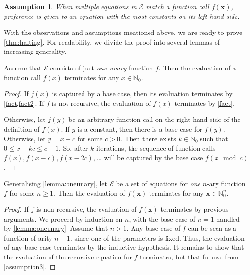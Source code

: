 \documentclass[a4paper,UKenglish,cleveref, autoref, thm-restate]{lipics-v2021}
\newtheorem{assumption}[theorem]{Assumption}
\begin{document}
\begin{assumption}
  When multiple equations in $\mathcal{E}$ match a function call
  $f(\mathbf{x})$, preference is given to an equation with the most constants on
  its left-hand side.
\end{assumption}

With the observations and assumptions mentioned above, we are ready to prove
\cref{thm:halting}. For readability, we divide the proof into several lemmas of
increasing generality.

\begin{lemma}\label{lemma:oneunary}
  Assume that $\mathcal{E}$ consists of just \emph{one unary} function $f$. Then
  the evaluation of a function call $f(x)$ terminates for any
  $x \in \mathbb{N}_{0}$.
\end{lemma}
\begin{proof}
  If $f(x)$ is captured by a base case, then its evaluation terminates by
  \cref{fact,fact2}. If $f$ is not recursive, the evaluation of
  $f(x)$ terminates by \cref{fact}.

  Otherwise, let $f(y)$ be an arbitrary function call on the right-hand side of
  the definition of $f(x)$. If $y$ is a constant, then there is a base case for
  $f(y)$. Otherwise, let $y = x - c$ for some $c > 0$. Then there exists
  $k \in \mathbb{N}_{0}$ such that $0 \le x - kc \le c-1$. So, after $k$
  iterations, the sequence of function calls $f(x), f(x-c), f(x-2c),\dots$ will
  be captured by the base case $f(x \mod c)$.
\end{proof}

\begin{lemma}\label{lemma:onefunction}
  Generalising \cref{lemma:oneunary}, let $\mathcal{E}$ be a set of equations
  for \emph{one} $n$-ary function $f$ for some $n \ge 1$. Then the evaluation of
  $f(\mathbf{x})$ terminates for any $\mathbf{x} \in \mathbb{N}_{0}^{n}$.
\end{lemma}
\begin{proof}
  If $f$ is non-recursive, the evaluation of $f(\mathbf{x})$ terminates by
  previous arguments. We proceed by induction on $n$, with the base case of
  $n=1$ handled by \cref{lemma:oneunary}. Assume that $n > 1$. Any base case of
  $f$ can be seen as a function of arity $n-1$, since one of the parameters is
  fixed. Thus, the evaluation of any base case terminates by the inductive
  hypothesis. It remains to show that the evaluation of the recursive equation
  for $f$ terminates, but that follows from \cref{assumption3}.
\end{proof}
\end{document}
